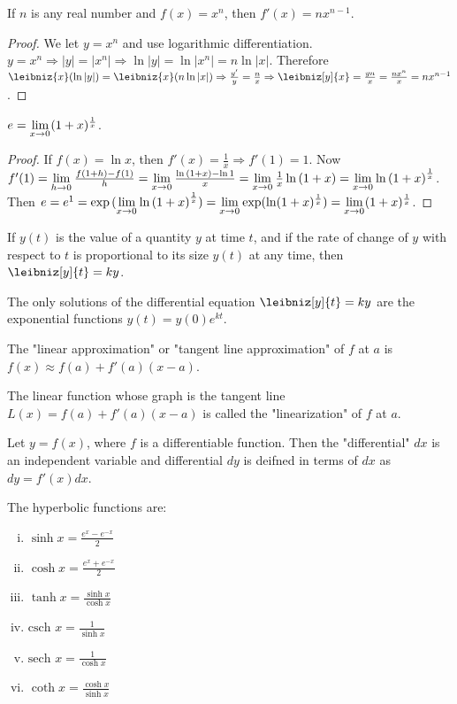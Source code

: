 \documentclass[a4paper,11pt]{article}
\begin{document}
\begin{outline}
    If \(n\) is any real number and \(f(x) = x^n\), then \(f'(x)=nx^{n-1}\).
    
    \begin{proof}
      We let \(y = x^n\) and use logarithmic differentiation. \(y = x^n \Rightarrow |y| = |x^n| \Rightarrow
      \ln{|y|} = \ln{|x^n|} = n\ln{|x|}\). Therefore \(\leibniz{x}(\ln{|y|}) = \leibniz{x}(n\ln{|x|}) \Rightarrow
      \frac{y'}{y} = \frac{n}{x} \Rightarrow \leibniz[y]{x} = \frac{yn}{x} = \frac{nx^n}{x} = nx^{n-1}\).
    \end{proof}
    
    \(e = \lim\limits_{x\rightarrow 0^{}}(1+x)^{\frac{1}{x}}\).
    
    \begin{proof}
      If \(f(x) = \ln{x}\), then \(f'(x) = \frac{1}{x} \Rightarrow f'(1) = 1\). Now \(f'(1) = \lim\limits_{h\rightarrow 0^{}}
      \frac{f(1+h)-f(1)}{h} = \lim\limits_{x\rightarrow 0^{}}\frac{\ln{(1+x)}-\ln{1}}{x} = \lim\limits_{x\rightarrow 0^{}}\frac{1}{x}\ln{(1+x)}
      = \lim\limits_{x\rightarrow 0^{}} \ln{(1+x)}^{\frac{1}{x}}\). Then \(e = e^{1} = \exp{( \lim\limits_{x\rightarrow 0^{}} \ln{(1+x)}^{\frac{1}{x}})}
      = \lim\limits_{x\rightarrow 0^{}} \exp(\ln({1+x})^{\frac{1}{x}}) = \lim\limits_{x\rightarrow 0^{}}(1+x)^{\frac{1}{x}}\).
    \end{proof}
    
    If \(y(t)\) is the value of a quantity \(y\) at time \(t\), and if the rate of change of \(y\) with respect
    to \(t\) is proportional to its size \(y(t)\) at any time, then \(\leibniz[y]{t}=ky\).
    
    The only solutions of the differential equation \(\leibniz[y]{t} = ky\) are the exponential functions
    \(y(t)=y(0)e^{kt}\).
    
    The "linear approximation" or "tangent line approximation" of \(f\) at \(a\) is \(f(x) \approx f(a) + f'(a)(x-a)\).
    
    The linear function whose graph is the tangent line \(L(x)=f(a)+f'(a)(x-a)\) is called the "linearization"
    of \(f\) at \(a\).
    
    Let \(y = f(x)\), where \(f\) is a differentiable function. Then the "differential" \(dx\) is an independent
    variable and differential \(dy\) is deifned in terms of \(dx\) as \(dy = f'(x)dx\).
    
    The hyperbolic functions are:
    \begin{enumerate}[i.]
      \item \(\sinh{x} = \frac{e^x - e^{-x}}{2}\)
      \item \(\cosh{x} = \frac{e^x+e^{-x}}{2}\)
      \item \(\tanh{x} = \frac{\sinh{x}}{\cosh{x}}\)
      \item \(\text{csch }x = \frac{1}{\sinh{x}}\)
      \item \(\text{sech }x = \frac{1}{\cosh{x}}\)
      \item \(\coth{x} = \frac{\cosh{x}}{\sinh{x}}\)
    \end{enumerate}
  
\end{outline}
\end{document}
